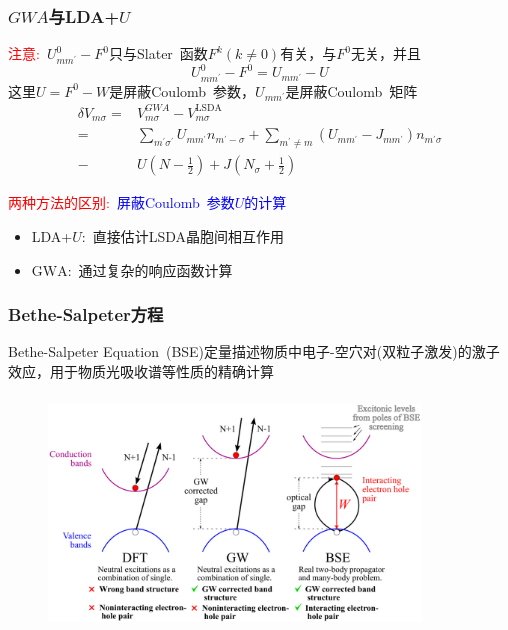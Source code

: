 \frame
{
	\frametitle{$GWA$与\textrm{LDA+}$U$}
	\textcolor{red}{注意:~}$U_{mm^{\prime}}^0-F^0$只与\textrm{Slater~}函数$F^k(k\neq0)$有关，与$F^0$无关，并且
	\begin{displaymath}
		U_{mm^{\prime}}^0-F^0=U_{mm^{\prime}}-U
	\end{displaymath}
	这里$U=F^0-W$是屏蔽\textrm{Coulomb~}参数，$U_{mm^{\prime}}$是屏蔽\textrm{Coulomb~}矩阵
	\begin{displaymath}
		\begin{aligned}
			\delta V_{m\sigma}=&V_{m\sigma}^{GWA}-V_{m\sigma}^{\mathrm{LSDA}}\\
			=&\sum_{m^{\prime}\sigma^{\prime}}U_{mm^{\prime}}n_{m^{\prime}-\sigma}+\sum_{m^{\prime}\neq m}(U_{mm^{\prime}}-J_{mm^{\prime}})n_{m^{\prime}\sigma}\\
			-&U(N-\frac12)+J(N_{\sigma}+\frac12)
		\end{aligned}
	\end{displaymath}

	\textcolor{red}{两种方法的区别:~}\textcolor{blue}{屏蔽\textrm{Coulomb~}参数$U$的计算}
	\begin{itemize}
		\item \textrm{LDA+}$U$:~直接估计\textrm{LSDA}晶胞间相互作用
		\item $\mathrm{GWA}$:~通过复杂的响应函数计算
	\end{itemize}
}

\frame
{
	\frametitle{\textrm{Bethe-Salpeter}方程}
	\textrm{Bethe-Salpeter Equation~(BSE)}定量描述物质中电子-空穴对(双粒子激发)的激子效应，用于物质光吸收谱等性质的精确计算
\begin{figure}[h!]
\centering
\vspace{-5pt}
\includegraphics[height=2.45in,width=3.90in,viewport=0 0 1000 600,clip]{Figures/BSE_GW_DFT.png}
\label{GW-BSE_GW_DFT}
\end{figure}
}

